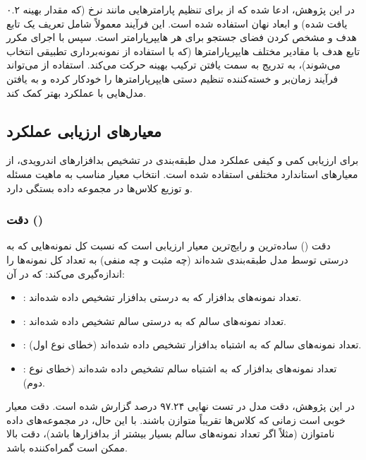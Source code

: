 در این پژوهش، ادعا شده که از  برای تنظیم پارامترهایی مانند نرخ  (که مقدار بهینه ۰.۲ یافت شده) و ابعاد نهان  استفاده شده است. این فرآیند معمولاً شامل تعریف یک تابع هدف  و مشخص کردن فضای جستجو برای هر هایپرپارامتر است. سپس  با اجرای مکرر تابع هدف با مقادیر مختلف هایپرپارامترها (که با استفاده از نمونه‌برداری تطبیقی انتخاب می‌شوند)، به تدریج به سمت یافتن ترکیب بهینه حرکت می‌کند. استفاده از  می‌تواند فرآیند زمان‌بر و خسته‌کننده تنظیم دستی هایپرپارامترها را خودکار کرده و به یافتن مدل‌هایی با عملکرد بهتر کمک کند.

\subsection{معیارهای ارزیابی عملکرد}
برای ارزیابی کمی و کیفی عملکرد مدل طبقه‌بندی  در تشخیص بدافزارهای اندرویدی، از معیارهای استاندارد مختلفی استفاده شده است. انتخاب معیار مناسب به ماهیت مسئله و توزیع کلاس‌ها در مجموعه داده بستگی دارد.

\subsubsection{دقت ()}
دقت () ساده‌ترین و رایج‌ترین معیار ارزیابی است که نسبت کل نمونه‌هایی که به درستی توسط مدل طبقه‌بندی شده‌اند (چه مثبت و چه منفی) به تعداد کل نمونه‌ها را اندازه‌گیری می‌کند:
\lr{\[ \text{Accuracy} = \frac{\text{TP} + \text{TN}}{\text{TP} + \text{TN} + \text{FP} + \text{FN}} \]}
که در آن:
\begin{itemize}
    \renewcommand{\labelitemi}{\lr{$\bullet$}}
    \item {}: تعداد نمونه‌های بدافزار که به درستی بدافزار تشخیص داده شده‌اند.
    \item {}: تعداد نمونه‌های سالم که به درستی سالم تشخیص داده شده‌اند.
    \item {}: تعداد نمونه‌های سالم که به اشتباه بدافزار تشخیص داده شده‌اند (خطای نوع اول).
    \item {}: تعداد نمونه‌های بدافزار که به اشتباه سالم تشخیص داده شده‌اند (خطای نوع دوم).
\end{itemize}
در این پژوهش، دقت مدل  در تست نهایی ۹۷.۲۴ درصد گزارش شده است. دقت معیار خوبی است زمانی که کلاس‌ها تقریباً متوازن باشند. با این حال، در مجموعه‌های داده نامتوازن (مثلاً اگر تعداد نمونه‌های سالم بسیار بیشتر از بدافزارها باشد)، دقت بالا ممکن است گمراه‌کننده باشد.

